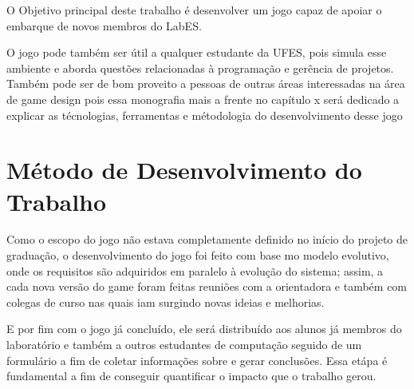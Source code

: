 O Objetivo principal deste trabalho é desenvolver um jogo capaz de apoiar o embarque de novos membros do LabES. 


O jogo pode também ser útil a qualquer estudante da UFES, pois simula esse ambiente e aborda questões relacionadas à programação e gerência de projetos. Também pode ser de bom proveito a pessoas de outras áreas interessadas na área de game design pois essa monografia mais a frente no capítulo x será dedicado a explicar as técnologias, ferramentas e métodologia do desenvolvimento desse jogo





\section{Método de Desenvolvimento do Trabalho}
\label{sec-intro-met}


Como o escopo do jogo não estava completamente definido no início do projeto de graduação, o desenvolvimento do jogo foi feito com base mo modelo evolutivo, onde os requisitos são adquiridos em paralelo à evolução do sistema; assim, a cada nova versão do game foram feitas reuniões com a orientadora e também com colegas de curso nas quais iam surgindo novas ideias e melhorias.  

E por fim com o jogo já concluído, ele será distribuído aos alunos já membros do laboratório e também a outros estudantes de computação seguido de um formulário a fim de coletar informações sobre e gerar conclusões. Essa etápa é fundamental a fim de conseguir quantificar o impacto que o trabalho gerou.




